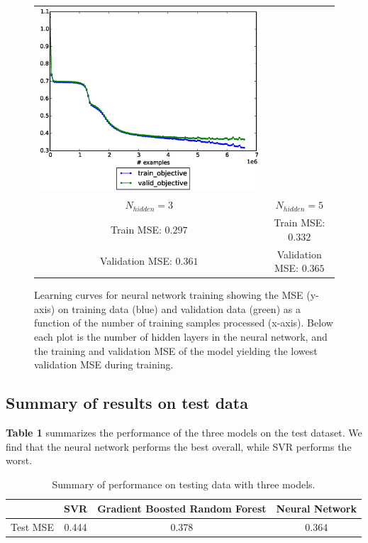 \documentclass[12pt] {article}
\renewcommand{\baselinestretch}{1.5} %
\begin{document}
\begin{figure}[h!]
\begin{tabular}{cc}
\includegraphics[trim = 0mm 20mm 0mm 10mm, clip=true, width=.45\textwidth]{figdir/nn_mse_5.eps} \\
$N_{hidden}=3$ & $N_{hidden}=5$ \\
Train MSE: $0.297$ & Train MSE: $0.332$ \\
Validation MSE: $0.361$ & Validation MSE: $0.365$ \\
\end{tabular}
\caption{Learning curves for neural network training showing the MSE (y-axis) on training data (blue) and validation data (green) as a function of the number of training samples processed (x-axis). Below each plot is the number of hidden layers in the neural network, and the training and validation MSE of the model yielding the lowest validation MSE during training.}
\end{figure}
\renewcommand{\baselinestretch}{1.5} %

\subsection{Summary of results on test data}
\textbf{Table 1} summarizes the performance of the three models on the test dataset. We find that the neural network performs the best overall, while SVR performs the worst.
\begin{table}\centering
\begin{tabular}{cccc}
& SVR & Gradient Boosted Random Forest & Neural Network \\
\hline
Test MSE & 0.444 & 0.378 & 0.364
\end{tabular}
\caption{Summary of performance on testing data with three models.}
\end{table}
\end{document}
